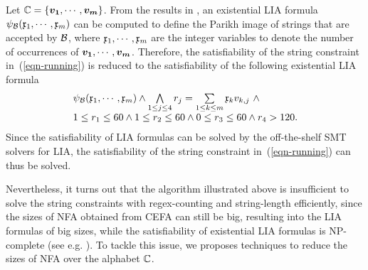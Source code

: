 %
Let $\costset = \{\myvec{v_1}, \cdots, \myvec{v_m}\}$. 
From the results in \cite{SSMH04,VSS05}, an existential LIA formula $\psi_{\mathcal{B}}(\mathfrak{x}_1, \cdots, \mathfrak{x}_m)$ can be computed to define the Parikh image of strings that are accepted by $\mathcal{B}$, where $\mathfrak{x}_1, \cdots, \mathfrak{x}_m$ are the integer variables to denote the number of occurrences of $\myvec{v_1}, \cdots, \myvec{v_m}$.
Therefore, the satisfiability of the string constraint in~(\ref{eqn-running}) is reduced to the satisfiability of the following existential LIA formula
\begin{equation}\label{eqn-LIA}
\begin{array}{l}
\psi_{\mathcal{B}}(\mathfrak{x}_1, \cdots, \mathfrak{x}_m) \wedge \bigwedge \limits_{1 \le j \le 4} r_j = \sum \limits_{1\le k \le m}  \mathfrak{x}_k v_{k, j}\ \wedge \\
1 \le r_1 \le 60 \wedge 1 \le r_2 \le 60 \wedge 0 \le r_3 \le 60 \wedge r_4 > 120.
\end{array}
\end{equation}
Since the satisfiability of LIA formulas can be solved by the off-the-shelf SMT solvers for LIA, the satisfiability of the string constraint in~(\ref{eqn-running}) can thus be solved.

Nevertheless, it turns out that the algorithm illustrated above is insufficient to solve the string constraints with regex-counting and string-length efficiently, since the sizes of NFA obtained from CEFA can still be big, resulting into the LIA formulas of big sizes, while the satisfiability of existential LIA formulas is NP-complete (see e.g. \cite{Haase18}). 
To tackle this issue, we proposes techniques to reduce the sizes of NFA over the alphabet $\mathbb{C}$.



